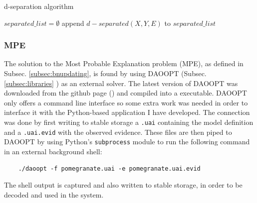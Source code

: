 \begin{algorithm}[htp!]
	\caption{d-separation algorithm}
	\label{alg:d-separation}
	\begin{algorithmic}[1]
		\State $separated\_list = \emptyset$
			\State append $d-separated(X, Y, E)$ to $separated\_list$ 
		\EndFor
	\end{algorithmic}
\end{algorithm}

\subsubsection{MPE}
The solution to the Most Probable Explanation problem (MPE), as defined in Subsec. \ref{subsec:bnupdating}, is found by using DAOOPT (Subsec. \ref{subsec:libraries} ) as an external solver.
The latest version of DAOOPT was downloaded from the github page (\cite{daoopt}) and compiled into a executable.
DAOOPT only offers a command line interface so some extra work was needed in order to interface it with the Python-based application I have developed.
The connection was done by first writing to stable storage a \texttt{.uai} containing the model definition and a \texttt{.uai.evid} with the observed evidence.
These files are then piped to DAOOPT by using Python's \texttt{subprocess} module to run the following command in an external background shell:
\begin{verbatim}
	./daoopt -f pomegranate.uai -e pomegranate.uai.evid
\end{verbatim}
The shell output is captured and also written to stable storage, in order to be decoded and used in the system.

